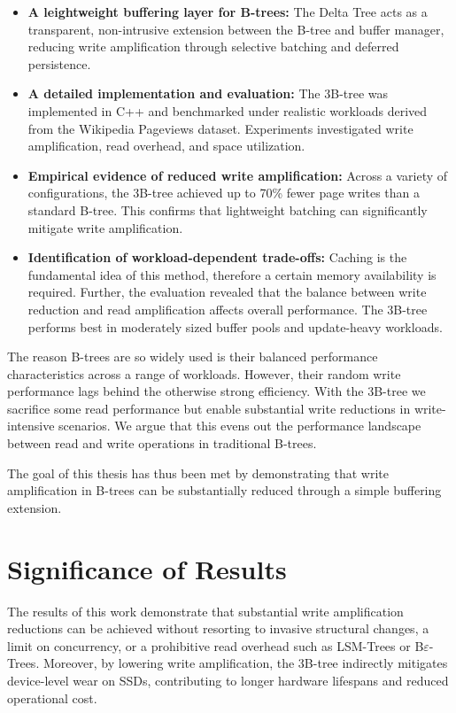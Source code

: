 \begin{itemize}
    \item \textbf{A leightweight buffering layer for B-trees:}  
    The Delta Tree acts as a transparent, non-intrusive extension between the B-tree and buffer manager, reducing write amplification through selective batching and deferred persistence.

    \item \textbf{A detailed implementation and evaluation:}  
    The 3B-tree was implemented in C++ and benchmarked under realistic workloads derived from the Wikipedia Pageviews dataset. 
    Experiments investigated write amplification, read overhead, and space utilization.

    \item \textbf{Empirical evidence of reduced write amplification:}  
    Across a variety of configurations, the 3B-tree achieved up to 70\% fewer page writes than a standard B-tree. This confirms that lightweight batching can significantly mitigate write amplification. 

    \item \textbf{Identification of workload-dependent trade-offs:}  
    Caching is the fundamental idea of this method, therefore a certain memory availability is required.
    Further, the evaluation revealed that the balance between write reduction and read amplification affects overall performance.
    The 3B-tree performs best in moderately sized buffer pools and update-heavy workloads.
\end{itemize}

The reason B-trees are so widely used is their balanced performance characteristics across a range of workloads.
However, their random write performance lags behind the otherwise strong efficiency.
With the 3B-tree we sacrifice some read performance but enable substantial write reductions in write-intensive scenarios.
We argue that this evens out the performance landscape between read and write operations in traditional B-trees.

The goal of this thesis has thus been met by demonstrating that write amplification in B-trees can be substantially reduced through a simple buffering extension.

\section{Significance of Results}
The results of this work demonstrate that substantial write amplification reductions can be achieved without resorting to invasive structural changes, a limit on concurrency, or a prohibitive read overhead such as LSM-Trees or B$\varepsilon$-Trees.
Moreover, by lowering write amplification, the 3B-tree indirectly mitigates device-level wear on SSDs, contributing to longer hardware lifespans and reduced operational cost. 

